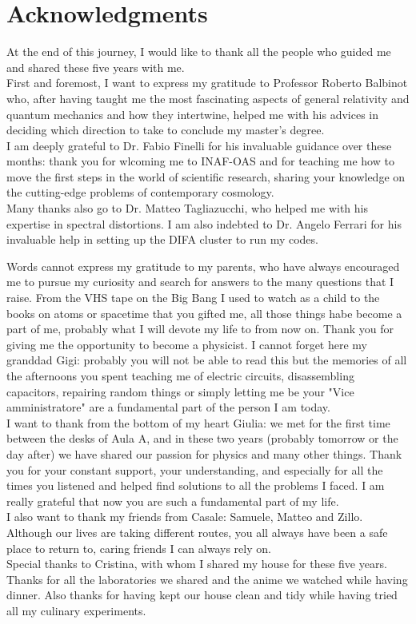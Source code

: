 \newpage
\section*{Acknowledgments}
At the end of this journey, I would like to thank all the people who guided me and shared these five years with me.\\
First and foremost, I want to express my gratitude to Professor Roberto Balbinot who, after having taught me the most fascinating aspects of general relativity and quantum mechanics and how they intertwine, helped me with his advices in deciding which direction to take to conclude my master's degree.\\
I am deeply grateful to Dr. Fabio Finelli for his invaluable guidance over these months: thank you for wlcoming me to INAF-OAS and for teaching me how to move the first steps in the world of scientific research, sharing your knowledge on the cutting-edge problems of contemporary cosmology. \\
Many thanks also go to Dr. Matteo Tagliazucchi, who helped me with his expertise in spectral distortions. I am also indebted to Dr. Angelo Ferrari for his invaluable help in setting up the DIFA cluster to run my codes.

Words cannot express my gratitude to my parents, who have always encouraged me to pursue my curiosity and search for answers to the many questions that I raise. From the VHS tape on the Big Bang I used to watch  as a child to the books on atoms or spacetime that you gifted me, all those things habe become a part of me, probably what I will devote my life to from now on. Thank you for giving me the opportunity to become a physicist. I cannot forget here my granddad Gigi: probably you will not be able to read this but the memories of all the afternoons you spent teaching me of electric circuits, disassembling capacitors, repairing random things or simply letting me be your "Vice amministratore" are a fundamental part of the person I am today.\\
I want to thank from the bottom of my heart Giulia: we met for the first time between the desks of Aula A, and in these two years (probably tomorrow or the day after) we have shared our passion for physics and many other things. Thank you for your constant support, your understanding, and especially for all the times you listened and helped find solutions to all the problems I faced. I am really grateful that now you are such a fundamental part of my life.\\
I also want to thank my friends from Casale: Samuele, Matteo and Zillo. Although our lives are taking different routes, you all always have been a safe place to return to, caring friends I can always rely on.\\
Special thanks to Cristina, with whom I shared my house for these five years. Thanks for all the laboratories we shared and the anime we watched while having dinner. Also thanks for having kept our house clean and tidy while having tried all my culinary experiments. 


